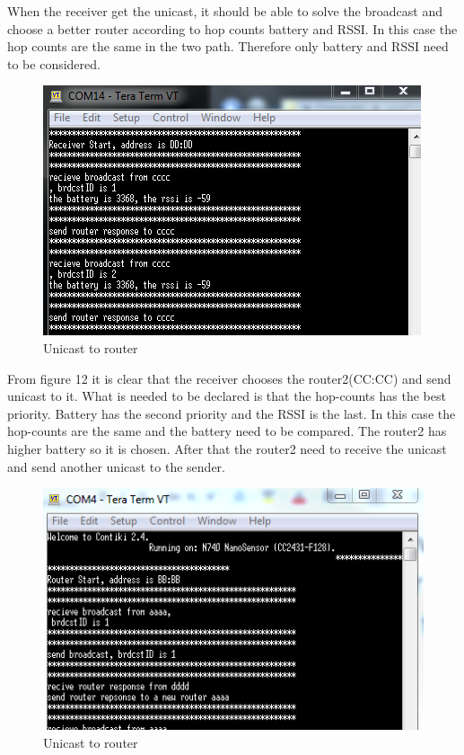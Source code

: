 \documentclass[a4paper]{article}
\begin{document}
When the receiver get the unicast, it should be able to solve the broadcast and choose a better router according to hop counts battery and RSSI. In this case the hop counts are the same in the two path. Therefore only battery and RSSI need to be considered.

\begin{figure}[!htb]
   \centering
   \includegraphics[scale=0.8]{test4}
	\begin{center}
	   \caption{Unicast to router}
	\end{center}	   
    \label{fig:test4}
\end{figure}

From figure 12 it is clear that the receiver chooses the router2(CC:CC) and send unicast to it. What is needed to be declared is that the hop-counts has the best priority. Battery has the second priority and the RSSI is the last. In this case the hop-counts are the same and the battery need to be compared. The router2 has higher battery so it is chosen.
After that the router2 need to receive the unicast and send another unicast to the sender.

\begin{figure}[!htb]
   \centering
   \includegraphics[scale=0.8]{test5}
	\begin{center}
	   \caption{Unicast to router}
	\end{center}	   
    \label{fig:test5}
\end{figure}
\end{document}
